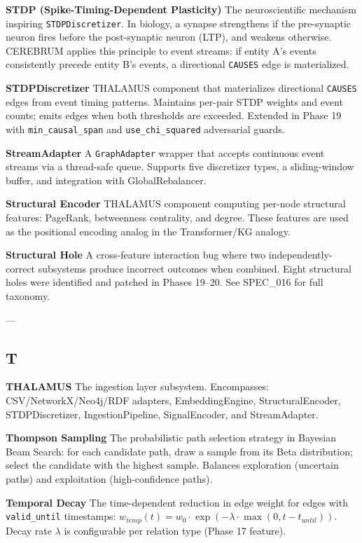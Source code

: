 \documentclass[11pt,article,oneside]{memoir}
\begin{document}
\textbf{STDP (Spike-Timing-Dependent Plasticity)}
The neuro\-scientific mechanism inspiring \texttt{STDPDiscretizer}. In biology, a synapse strengthens if the pre-synaptic neuron fires before the post-synaptic neuron (LTP), and weakens otherwise. CEREBRUM applies this principle to event streams: if entity A's events consi\-stently precede entity B's events, a directional \texttt{CAUSES} edge is mater\-ialized.

\textbf{STDPDiscre\-tizer}
THALAMUS component that mater\-ializes directional \texttt{CAUSES} edges from event timing patterns. Maintains per-pair STDP weights and event counts; emits edges when both thresholds are exceeded. Extended in Phase 19 with \texttt{min\_causal\_span} and \texttt{use\_chi\_squared} adversarial guards.

\textbf{StreamAdapter}
A \texttt{GraphAdapter} wrapper that accepts continuous event streams via a thread-safe queue. Supports five discretizer types, a sliding-window buffer, and integration with GlobalRebalancer.

\textbf{Structural Encoder}
THALAMUS component computing per-node structural features: PageRank, betweenness centrality, and degree. These features are used as the positional encoding analog in the Transformer/KG analogy.

\textbf{Structural Hole}
A cross-feature interaction bug where two indep\-endently-correct subsystems produce incorrect outcomes when combined. Eight structural holes were identified and patched in Phases 19–20. See SPEC\_016 for full taxonomy.

---

\subsection{T}

\textbf{THALAMUS}
The ingestion layer subsystem. Encompasses: CSV/NetworkX/Neo4j/RDF adapters, EmbeddingEngine, StructuralEncoder, STDPDiscre\-tizer, IngestionPipeline, SignalEncoder, and StreamAdapter.

\textbf{Thompson Sampling}
The proba\-bilistic path selection strategy in Bayesian Beam Search: for each candidate path, draw a sample from its Beta distr\-ibution; select the candidate with the highest sample. Balances exploration (uncertain paths) and explo\-itation (high-confidence paths).

\textbf{Temporal Decay}
The time-dependent reduction in edge weight for edges with \texttt{valid\_until} timestamps: $w_{temp}(t) = w_0 \cdot \exp(-\lambda \cdot \max(0, t - t_{until}))$. Decay rate $\lambda$ is confi\-gurable per relation type (Phase 17 feature).
\end{document}
